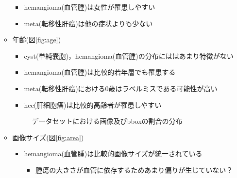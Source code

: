 \documentclass[a4j]{ujarticle}
\newcommand{\Fref}[1]{\mbox{図\ref{fig:#1}}}
\begin{document}
\begin{itemize}
\begin{itemize}
\begin{itemize}
\begin{itemize}
                    \end{itemize}
					\item hemangioma(血管腫)は女性が罹患しやすい
					\item meta(転移性肝癌)は他の症状よりも少ない
				\end{itemize}
				\item 年齢(\Fref{age})
				\begin{itemize}
					\item cyst(単純嚢胞)，hemangioma(血管腫)の分布にははあまり特徴がない
					\item hemangioma(血管腫)は比較的若年層でも罹患する
					\item meta(転移性肝癌)における0歳はラベルミスである可能性が高い
                    \item hcc(肝細胞癌)は比較的高齢者が罹患しやすい
				\end{itemize}
                \begin{figure}[ht]
					\caption{データセットにおける画像及びbboxの割合の分布}
				\end{figure}
				\item 画像サイズ(\Fref{area})
				\begin{itemize}
                    \item hemangioma(血管腫)は比較的画像サイズが統一されている
					\begin{itemize}
                        \item 腫瘍の大きさが血管に依存するためあまり偏りが生じていない？

\end{itemize}
\end{itemize}
\end{itemize}
\end{itemize}
\end{document}
